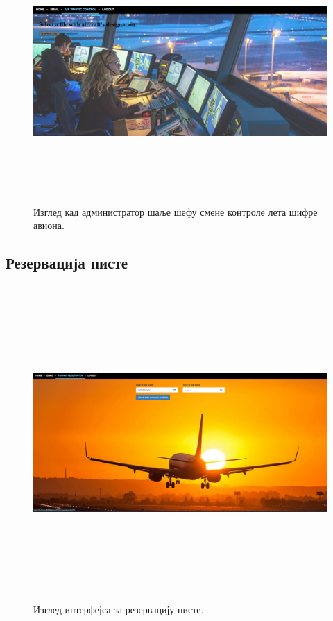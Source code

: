 \documentclass{article}
\begin{document}
\begin{figure}[H]
    \begin{center}
        \includegraphics[width=1.1\textwidth, height=10cm]{Dizajn/admin_kontrola_leta.png}
        \caption{Изглед кад администратор шаље шефу смене контроле лета шифре авиона.}
    \end{center}
\end{figure}

\subsection{Резервација писте}

\begin{figure}[H]
    \begin{center}
        \includegraphics[width=1.1\textwidth, height=12cm]{Dizajn/runway_reservation.png}
        \caption{Изглед интерфејса за резервацију писте.}
    \end{center}
\end{figure}
\end{document}
